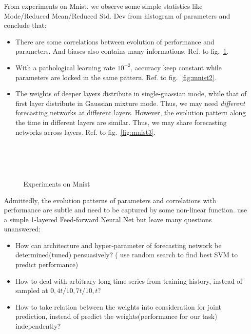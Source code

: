 \documentclass{mcmthesis}
\begin{document}
From experiments on Mnist, we observe some simple statistics like Mode/Reduced Mean/Reduced Std. Dev from histogram of parameters and conclude that:  
\begin{itemize}[noitemsep]%
	\item There are some correlations between evolution of performance and parameters.  And biases also contains many informations.  Ref. to fig.~\ref{fig:mnist}.
	\item With a pathological learning rate $10^{-2}$, accuracy keep constant while parameters are locked in the same pattern. Ref. to fig.~\ref{fig:mnist2}.
	\item The  weights of deeper layers distribute    in single-guassian mode, while 
	that of first layer distribute in Gaussian mixture mode. Thus, we may need \textit{different} forecasting networks at different layers. However, the evolution pattern along the time in different layers are  similar. Thus, we may share forecasting networks across layers.  Ref. to fig.~\ref{fig:mnist3}.
\end{itemize} 

\begin{figure} 
		\centering
		 \\
		 \\ 
		 \\ 
		\caption{Experiments on Mnist} 
		\label{fig:mnist}
\end{figure}

Admittedly, the evolution patterns of parameters and correlations with performance are subtle and need to be captured by some non-linear function. \cite{sinha2017introspection}  use a simple 1-layered Feed-forward Neural Net but leave many questions unanswered:
\begin{itemize}[noitemsep]%
	\item How can architecture and hyper-parameter of forecasting network be  determined(tuned) persuasively? (\cite{baker2017practical} use random search to find best SVM to predict performance) 
	\item How to deal with arbitrary long time series from training history, instead of sampled at $0,4t/10,7t/10,t$? 
	\item How to take relation between the weights into consideration for joint prediction, instead of predict the weights(performance for our task) independently?
\end{itemize}
\end{document}
